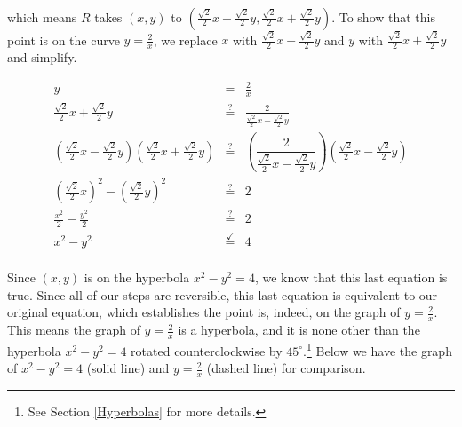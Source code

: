\begin{ex}
\[\begin{array}{rcl}
\end{array}\]

which means $R$ takes $(x,y)$ to $\left(\frac{\sqrt{2}}{2} x - \frac{\sqrt{2}}{2} y, \frac{\sqrt{2}}{2} x + \frac{\sqrt{2}}{2} y\right)$.  To show that this point is on the curve $y = \frac{2}{x}$, we replace $x$ with $\frac{\sqrt{2}}{2} x - \frac{\sqrt{2}}{2} y$ and $y$ with $\frac{\sqrt{2}}{2} x + \frac{\sqrt{2}}{2} y$ and simplify.

\[ \begin{array}{rcl}

y & = & \frac{2}{x} \\

\frac{\sqrt{2}}{2} x + \frac{\sqrt{2}}{2} y & \stackrel{?}{=} & \frac{2}{\frac{\sqrt{2}}{2} x - \frac{\sqrt{2}}{2} y} \\[10pt]

\left(\frac{\sqrt{2}}{2} x - \frac{\sqrt{2}}{2} y \right) \left(\frac{\sqrt{2}}{2} x + \frac{\sqrt{2}}{2} y \right)& \stackrel{?}{=} & \left(\dfrac{2}{\frac{\sqrt{2}}{2} x - \frac{\sqrt{2}}{2} y}\right) \left(  \frac{\sqrt{2}}{2} x - \frac{\sqrt{2}}{2} y  \right)\\

\left(\frac{\sqrt{2}}{2} x \right)^2 - \left( \frac{\sqrt{2}}{2} y\right)^2 & \stackrel{?}{=} & 2 \\

\frac{x^2}{2} - \frac{y^2}{2} & \stackrel{?}{=} & 2 \\

x^2 - y^2 & \stackrel{\checkmark }{=}& 4  \\

\end{array} \]

Since $(x,y)$ is on the hyperbola $x^2 - y^2 = 4$, we know that this last equation is true.  Since all of our steps are reversible, this last equation is equivalent to our original equation, which establishes the point is, indeed, on the graph of $y = \frac{2}{x}$.  This means the graph of $y=\frac{2}{x}$ is a hyperbola, and it is none other than the hyperbola $x^2-y^2=4$ rotated counterclockwise by $45^{\circ}$.\footnote{See Section \ref{Hyperbolas} for more details.}  Below we have the graph of $x^2-y^2=4$ (solid line) and $y = \frac{2}{x}$ (dashed line) for comparison.

\begin{center}


\end{center}
\end{ex}
